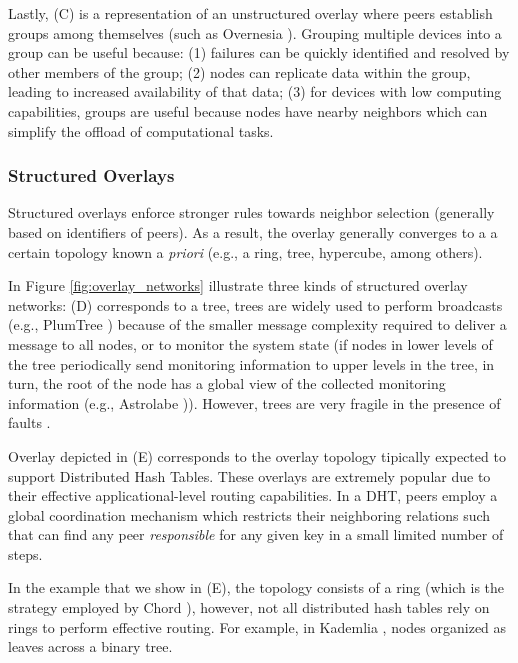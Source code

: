 Lastly, (C) is a representation of an unstructured overlay where peers establish groups among themselves (such as Overnesia \cite{leitao2014overnesia}). Grouping multiple devices into a group can be useful because: (1) failures can be quickly identified and resolved by other members of the group; (2) nodes can replicate data within the group, leading to increased availability of that data; (3) for devices with low computing capabilities, groups are useful because nodes have nearby neighbors which can simplify the offload of computational tasks. 

\subsubsection*{Structured Overlays}

Structured overlays enforce stronger rules towards neighbor selection (generally based on identifiers of peers). As a result, the overlay generally converges to a a certain topology known a \textit{priori} (e.g., a ring, tree, hypercube, among others). 

In Figure \ref{fig:overlay_networks} illustrate three kinds of structured overlay networks: (D) corresponds to a tree, trees are widely used to perform broadcasts (e.g., PlumTree \cite{plumTree}) because of the smaller message complexity required to deliver a message to all nodes, or to monitor the system state (if nodes in lower levels of the tree periodically send monitoring information to upper levels in the tree, in turn, the root of the node has a global view of the collected monitoring information (e.g., Astrolabe \cite{Renesse2003})). However, trees are very fragile in the presence of faults \cite{plumTree}.

Overlay depicted in (E) corresponds to the overlay topology tipically expected to support Distributed Hash Tables. These overlays are extremely popular due to their effective applicational-level routing capabilities. In a DHT, peers employ a global coordination mechanism which restricts their neighboring relations such that can find any peer \textit{responsible} for any given key in a small limited number of steps.

In the example that we show in (E), the topology consists of a ring (which is the strategy employed by Chord \cite{stoica2003chord}), however, not all distributed hash tables rely on rings to perform effective routing. For example, in Kademlia \cite{maymounkov2002kademlia}, nodes organized as leaves across a binary tree.


